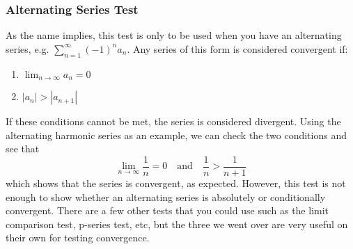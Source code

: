 \documentclass{article}
\newcommand{\be}{\begin{equation}}
\newcommand{\ee}{\end{equation}}
\begin{document}
\subsubsection*{Alternating Series Test}
As the name implies, this test is only to be used when you have an alternating series, e.g. $\sum\limits_{n=1}^{\infty} (-1)^n a_n$.
Any series of this form is considered convergent if:
\begin{enumerate}
  \item $\lim_{n \to \infty} a_n = 0$
  \item $|a_n| > |a_{n+1}|$
\end{enumerate}
If these conditions cannot be met, the series is considered divergent.
Using the alternating harmonic series as an example, we can check the two conditions and see that
\be
\lim_{n \to \infty} \frac{1}{n} = 0 \quad \text{and} \quad \frac{1}{n} > \frac{1}{n+1}
\ee
which shows that the series is convergent, as expected.
However, this test is not enough to show whether an alternating series is absolutely or conditionally convergent.
There are a few other tests that you could use such as the limit comparison test, p-series test, etc, but the three we went over are very useful on their own for testing convergence.
\end{document}
